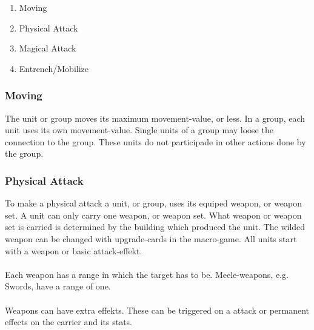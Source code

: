 \documentclass[a5paper,pagesize,10pt,bibtotoc,pointlessnumbers,
normalheadings,DIV=9,twoside=false]{scrbook}
\begin{document}
\begin{enumerate}
\item Moving
\item Physical Attack
\item Magical Attack
\item Entrench/Mobilize
\end{enumerate}

\subsubsection{Moving}
The unit or group moves its maximum movement-value, or less.
In a group, each unit uses its own movement-value. Single units of a group may loose the connection to the group. These units do not participade in other actions done by the group.

\subsubsection{Physical Attack}
To make a physical attack a unit, or group, uses its equiped weapon, or weapon set. 
A unit can only carry one weapon, or weapon set.
What weapon or weapon set is carried is determined by the building which produced the unit. The wilded weapon can be changed with upgrade-cards in the macro-game.
All units start with a weapon or basic attack-effekt.\\
\\
Each weapon has a range in which the target has to be. Meele-weapons, e.g. Swords, have a range of one.\\
\\
Weapons can have extra effekts. These can be triggered on a attack or permanent effects on the carrier and its stats.\\
\end{document}
